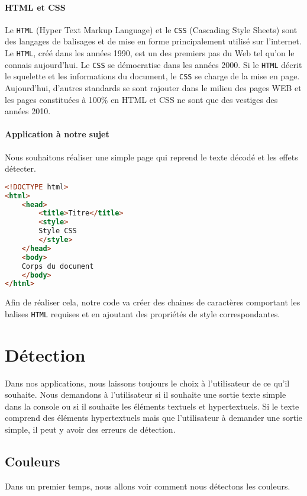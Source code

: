 \documentclass[a4paper,12pt,titlepage]{report}
\begin{document}
	\paragraph{HTML et CSS} Le \texttt{HTML} (Hyper Text Markup Language) et le \texttt{CSS} (Cascading Style Sheets) sont des langages de balisages et de mise en forme principalement utilisé sur l'internet. Le \texttt{HTML}, créé dans les années 1990, est un des premiers pas du Web tel qu'on le connais aujourd'hui. Le \texttt{CSS} se démocratise dans les années 2000. Si le \texttt{HTML} décrit le squelette et les informations du document, le \texttt{CSS} se charge de la mise en page. Aujourd'hui, d'autres standards se sont rajouter dans le milieu des pages WEB et les pages constituées à 100\% en HTML et CSS ne sont que des vestiges des années 2010.
	\paragraph{Application à notre sujet} Nous souhaitons réaliser une simple page qui reprend le texte décodé et les effets détecter.
\begin{lstlisting}[caption={Structure de base du HTML},language=HTML]
<!DOCTYPE html>
<html>
	<head>
		<title>Titre</title>
		<style>
		Style CSS
		</style>
	</head>
	<body>
	Corps du document
	</body>
</html>
\end{lstlisting}
	Afin de réaliser cela, notre code va créer des chaines de caractères comportant les balises \texttt{HTML} requises et en ajoutant des propriétés de style correspondantes.
	\section{Détection}
	Dans nos applications, nous laissons toujours le choix à l'utilisateur de ce qu'il souhaite. Nous demandons à l'utilisateur si il souhaite une sortie texte simple dans la console ou si il souhaite les éléments textuels et hypertextuels. Si le texte comprend des éléments hypertextuels mais que l'utilisateur à demander une sortie simple, il peut y avoir des erreurs de détection.
	\subsection{Couleurs}
	Dans un premier temps, nous allons voir comment nous détectons les couleurs. 
\end{document}

